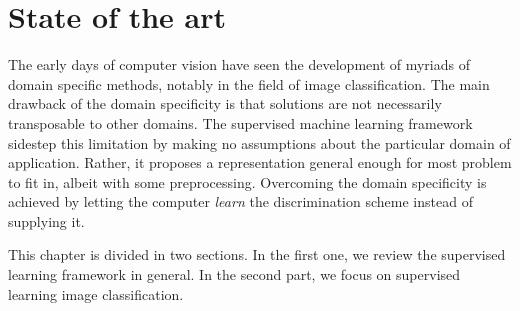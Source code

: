 \documentclass[a4paper]{report}
\begin{document}
\chapter{\label{chap:SotA}State of the art}
The early days of computer vision have seen the development of myriads of domain specific methods, notably in the field of image classification. The main drawback of the domain specificity is that solutions are not necessarily transposable to other domains. The supervised machine learning framework sidestep this limitation by making no assumptions about the particular domain of application. Rather, it proposes a representation general enough for most problem to fit in, albeit with some preprocessing. Overcoming the domain specificity is achieved by letting the computer \textit{learn} the discrimination scheme instead of supplying it.
\par
This chapter is divided in two sections. In the first one, we review the supervised learning framework in general. In the second part, we focus on supervised learning image classification.
\end{document}

